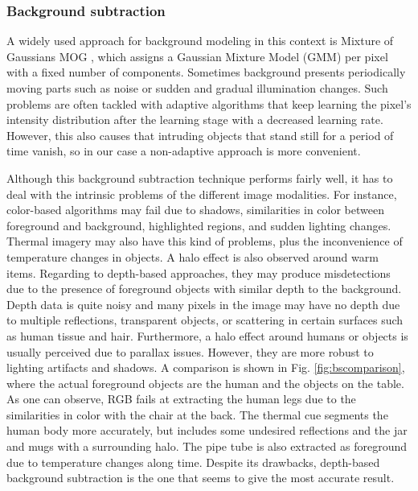 \documentclass[10pt,twocolumn,letterpaper]{article}
\begin{document}
\subsubsection{Background subtraction}
\label{sect:bs}
 A widely used approach for background modeling in this context is Mixture of Gaussians MOG  \cite{bouwmans2008background}, which assigns a Gaussian Mixture Model (GMM) per pixel with a fixed number of components. Sometimes background presents periodically moving parts such as noise or sudden and gradual illumination changes. Such problems are often tackled with adaptive algorithms that keep learning the pixel's intensity distribution after the learning stage with a decreased learning rate. However, this also causes that intruding objects that stand still for a period of time vanish, so in our case a non-adaptive approach is more convenient.

Although this background subtraction technique performs fairly well, it has to deal with the intrinsic problems of the different image modalities. For instance, color-based algorithms may fail due to shadows, similarities in color between foreground and background, highlighted regions, and sudden lighting changes. Thermal imagery may also have this kind of problems, plus the inconvenience of temperature changes in objects. A halo effect is also observed around warm items. Regarding to depth-based approaches, they may produce misdetections due to the presence of foreground objects with similar depth to the background. Depth data is quite noisy and many pixels in the image may have no depth due to multiple reflections, transparent objects, or scattering in certain surfaces such as human tissue and hair. Furthermore, a halo effect around humans or objects is usually perceived due to parallax issues. However, they are more robust to lighting artifacts and shadows. A comparison is shown in Fig. \ref{fig:bscomparison}, where the actual foreground objects are the human and the objects on the table. As one can observe, RGB fails at extracting the human legs due to the similarities in color with the chair at the back. The thermal cue segments the human body more accurately, but includes some undesired reflections and the jar and mugs with a surrounding halo. The pipe tube is also extracted as foreground due to temperature changes along time. Despite its drawbacks, depth-based background subtraction is the one that seems to give the most accurate result. 
\end{document}
